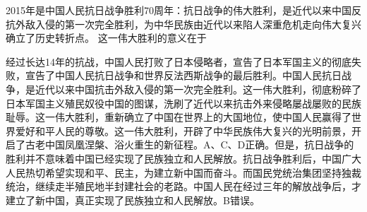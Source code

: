 \question 2015年是中国人民抗日战争胜利70周年：抗日战争的伟大胜利，是近代以来中国反抗外敌入侵的第一次完全胜利，为中华民族由近代以来陷人深重危机走向伟大复兴确立了历史转折点。
这一伟大胜利的意义在于
\par{}
\begin{solution}经过长达14年的抗战，中国人民打败了日本侵略者，宣告了日本军国主义的彻底失败，宣告了中国人民抗日战争和世界反法西斯战争的最后胜利。中国人民抗日战争，是近代以来中国抗击外敌入侵的第一次完全胜利。这一伟大胜利，彻底粉碎了日本军国主义殖民奴役中国的图谋，洗刷了近代以来抗击外来侵略屡战屡败的民族耻辱。这一伟大胜利，重新确立了中国在世界上的大国地位，使中国人民赢得了世界爱好和平人民的尊敬。这一伟大胜利，开辟了中华民族伟大复兴的光明前景，开启了古老中国凤凰涅槃、浴火重生的新征程。A、C、D正确。但是，抗日战争的胜利并不意味着中国已经实现了民族独立和人民解放。抗日战争胜利后，中国广大人民热切希望实现和平、民主，为建立新中国而奋斗。而国民党统治集团坚持独裁统治，继续走半殖民地半封建社会的老路。中国人民在经过三年的解放战争后，才建立了新中国，真正实现了民族独立和人民解放。B错误。
\end{solution}
